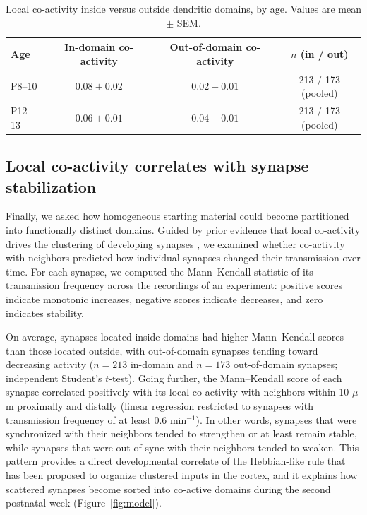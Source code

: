 \documentclass[11pt]{article}
\begin{document}
\begin{table}[htbp]
\centering
\caption{Local co-activity inside versus outside dendritic domains, by age. Values are mean $\pm$ SEM.}
\label{tab:coactivity}
\begin{tabular}{lccc}
\toprule
Age & In-domain co-activity & Out-of-domain co-activity & $n$ (in / out) \\
\midrule
P8--10 & $0.08 \pm 0.02$ & $0.02 \pm 0.01$ & 213 / 173 (pooled) \\
P12--13 & $0.06 \pm 0.01$ & $0.04 \pm 0.01$ & 213 / 173 (pooled) \\
\bottomrule
\end{tabular}
\end{table}

\subsection{Local co-activity correlates with synapse stabilization}

Finally, we asked how homogeneous starting material could become partitioned into functionally distinct domains. Guided by prior evidence that local co-activity drives the clustering of developing synapses \citep{winnubst2012synaptic}, we examined whether co-activity with neighbors predicted how individual synapses changed their transmission over time. For each synapse, we computed the Mann--Kendall statistic of its transmission frequency across the recordings of an experiment: positive scores indicate monotonic increases, negative scores indicate decreases, and zero indicates stability.

On average, synapses located inside domains had higher Mann--Kendall scores than those located outside, with out-of-domain synapses tending toward decreasing activity ($n = 213$ in-domain and $n = 173$ out-of-domain synapses; independent Student's $t$-test). Going further, the Mann--Kendall score of each synapse correlated positively with its local co-activity with neighbors within 10 $\mu$m proximally and distally (linear regression restricted to synapses with transmission frequency of at least 0.6 min$^{-1}$). In other words, synapses that were synchronized with their neighbors tended to strengthen or at least remain stable, while synapses that were out of sync with their neighbors tended to weaken. This pattern provides a direct developmental correlate of the Hebbian-like rule that has been proposed to organize clustered inputs in the cortex, and it explains how scattered synapses become sorted into co-active domains during the second postnatal week (Figure~\ref{fig:model}).
\end{document}
